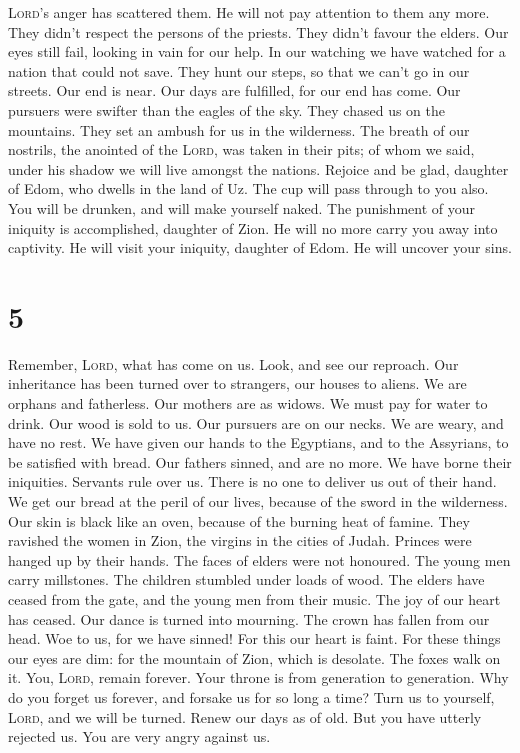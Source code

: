 \textsc{Lord}'s anger has scattered them. He will not pay attention to
them any more. They didn't respect the persons of the priests. They
didn't favour the elders.  Our eyes still fail, looking
in vain for our help. In our watching we have watched for a nation that
could not save.  They hunt our steps, so that we can't go
in our streets. Our end is near. Our days are fulfilled, for our end has
come.  Our pursuers were swifter than the eagles of the
sky. They chased us on the mountains. They set an ambush for us in the
wilderness.  The breath of our nostrils, the anointed of
the \textsc{Lord}, was taken in their pits; of whom we said, under his
shadow we will live amongst the nations.  Rejoice and be
glad, daughter of Edom, who dwells in the land of Uz. The cup will pass
through to you also. You will be drunken, and will make yourself naked.
 The punishment of your iniquity is accomplished,
daughter of Zion. He will no more carry you away into captivity. He will
visit your iniquity, daughter of Edom. He will uncover your sins.

\hypertarget{section-4}{%
\section{5}\label{section-4}}

 Remember, \textsc{Lord}, what has come on us. Look, and
see our reproach.  Our inheritance has been turned over to
strangers, our houses to aliens.  We are orphans and
fatherless. Our mothers are as widows.  We must pay for
water to drink. Our wood is sold to us.  Our pursuers are
on our necks. We are weary, and have no rest.  We have
given our hands to the Egyptians, and to the Assyrians, to be satisfied
with bread.  Our fathers sinned, and are no more. We have
borne their iniquities.  Servants rule over us. There is
no one to deliver us out of their hand.  We get our bread
at the peril of our lives, because of the sword in the wilderness.
 Our skin is black like an oven, because of the burning
heat of famine.  They ravished the women in Zion, the
virgins in the cities of Judah.  Princes were hanged up
by their hands. The faces of elders were not honoured. 
The young men carry millstones. The children stumbled under loads of
wood.  The elders have ceased from the gate, and the
young men from their music.  The joy of our heart has
ceased. Our dance is turned into mourning.  The crown has
fallen from our head. Woe to us, for we have sinned!  For
this our heart is faint. For these things our eyes are dim:
 for the mountain of Zion, which is desolate. The foxes
walk on it.  You, \textsc{Lord}, remain forever. Your
throne is from generation to generation.  Why do you
forget us forever, and forsake us for so long a time? 
Turn us to yourself, \textsc{Lord}, and we will be turned. Renew our
days as of old.  But you have utterly rejected us. You
are very angry against us.
